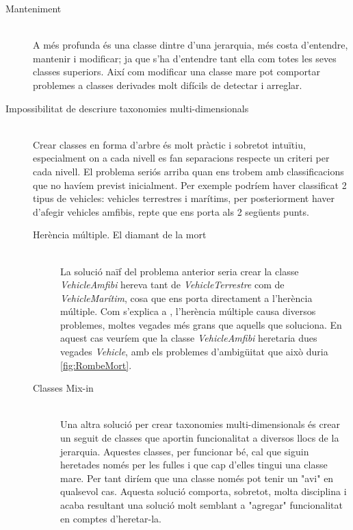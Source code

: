 \begin{description}
  \item[Manteniment] \hfill \\
    A més profunda és una classe dintre d'una jerarquia, més costa d'entendre, mantenir i modificar; ja que s'ha d'entendre tant ella com totes les seves classes superiors. Així com modificar una classe mare pot comportar problemes  a classes derivades molt difícils de detectar i arreglar.
    
  \item[Impossibilitat de descriure taxonomies multi-dimensionals] \hfill \\
    Crear classes en forma d'arbre és molt pràctic i sobretot intuïtiu, especialment on a cada nivell es fan separacions respecte un criteri per cada nivell. El problema seriós arriba quan ens trobem amb classificacions que no havíem previst inicialment. Per exemple podríem haver classificat 2 tipus de vehicles: vehicles terrestres i marítims, per posteriorment haver d'afegir vehicles amfibis, repte que ens porta als 2 següents punts.
    \begin{description}
      \item[Herència múltiple. El diamant de la mort] \hfill \\
        La solució naïf del problema anterior seria crear la classe {\em VehicleAmfibi} hereva tant de {\em VehicleTerrestre} com de {\em VehicleMarítim}, cosa que ens porta directament a l'herència múltiple. Com s'explica a \cite[p.~2]{Martin97}, l'herència múltiple causa diversos problemes, moltes vegades més grans que aquells que soluciona. En aquest cas veuríem que la classe {\em VehicleAmfibi} heretaria dues vegades {\em Vehicle}, amb els problemes d'ambigüitat que això duria \ref{fig:RombeMort}.
        
      \item[Classes Mix-in] \hfill \\
        Una altra solució per crear taxonomies multi-dimensionals és crear un seguit de classes que aportin funcionalitat a diversos llocs de la jerarquia. Aquestes classes, per funcionar bé, cal que siguin heretades només per les fulles i que cap d'elles tingui una classe mare. Per tant diríem que una classe només pot tenir un "avi" en qualsevol cas. Aquesta solució comporta, sobretot, molta disciplina i acaba resultant una solució molt semblant a "agregar" funcionalitat en comptes d'heretar-la.
        

\end{description}
\end{description}
